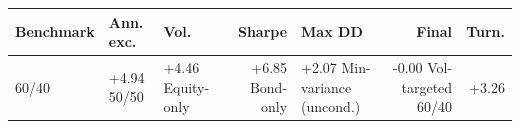 \begin{tabular}{lllrlrr}
\toprule
Benchmark & Ann. exc. & Vol. & Sharpe & Max DD & Final & Turn. \\
\midrule
60/40 & +4.94%
50/50 & +4.46%
Equity-only & +6.85%
Bond-only & +2.07%
Min-variance (uncond.) & -0.00%
Vol-targeted 60/40 & +3.26%
\bottomrule
\end{tabular}
